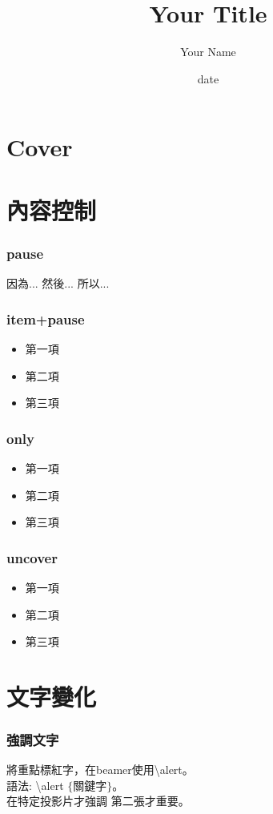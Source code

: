 \documentclass[xcolor=svgnames]{beamer}
\begin{document}
\title[Your Title\hspace{14em}\insertframenumber/\inserttotalframenumber]
{Your Title}

\author{Your Name}
\date{date}

\section{Cover}
\begin{frame}
\titlepage
\end{frame}

\section{內容控制}
\begin{frame}
\frametitle{pause} %
因為...
\pause
然後...
\pause
所以...
\end{frame}

\begin{frame}
\frametitle{item+pause} %
\begin{itemize}
\item 第一項
\pause
\item 第二項
\pause
\item 第三項
\end{itemize}
\end{frame}

\begin{frame}
\frametitle{only} %
\begin{itemize}
\item<1-> 第一項
\item<2-> 第二項
\item<3-> 第三項
\end{itemize}
\end{frame}

\begin{frame}
\frametitle{uncover} %
\begin{itemize}
\item<1-> 第一項
\item<2-> 第二項
\item<3-> 第三項
\end{itemize}
\end{frame}

\section{文字變化}
\begin{frame}
\frametitle{強調文字} %
將重點標紅字，在beamer使用\alert{\textbackslash alert}。\\ 
語法:
\textbackslash alert $\lbrace$關鍵字$\rbrace$。\\ 
在特定投影片才強調  
\alert<2>{第二張}才重要。  
\end{frame}
\end{document}
